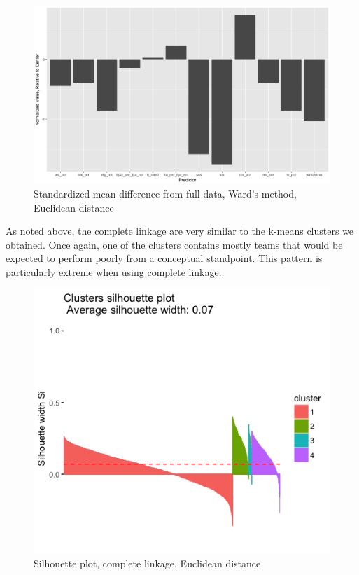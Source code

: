 \documentclass[10pt,a4paper, hidelinks]{article} %
\begin{document}

\begin{figure}[H]
	\centering
	\includegraphics[width=0.7\linewidth]{"../fig/wardweak"}
		\caption{Standardized mean difference from full data, Ward's method, Euclidean distance}
\end{figure}


As noted above, the complete linkage are very similar to the k-means clusters we obtained.
Once again, one of the clusters contains mostly teams that would be expected to perform poorly from a conceptual standpoint. This pattern is particularly extreme when using complete linkage.

\begin{figure}[H]
	\centering
	\includegraphics[width=0.5\linewidth]{"../fig/compsil"}
		\caption{Silhouette plot, complete linkage, Euclidean distance}
\end{figure}

\end{document}
